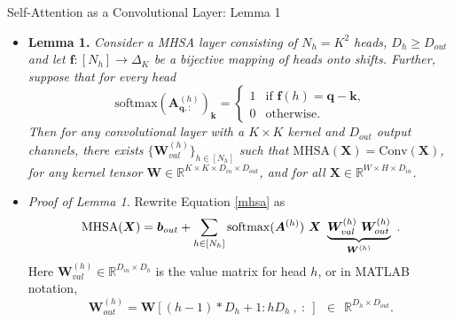 \documentclass[9pt]{beamer}
\newcommand{\bb}{\mathbb}
\newcommand{\mb}{\bm}
\begin{document}
\begin{frame}{Self-Attention as a Convolutional Layer: Lemma 1}
\begin{itemize}
\item \textbf{Lemma 1.} {\em Consider a MHSA layer consisting of $N_h = K^2$ heads, $D_h\geq D_{out}$ and let $\bm f:[N_h]\rightarrow\Delta_K$ be a bijective mapping of heads onto shifts. Further, suppose that for every head
\begin{equation}
\mathrm{softmax}(\mb A^{(h)}_{\mb q,:})_{\mb k} = \begin{cases}
    1 & \text{if } \mb f(h) = \mb q - \mb k,
    \\ 0 & \text{otherwise}.
    \end{cases} \label{lemma1_assumption}
\end{equation}
Then for any convolutional layer with a $K\times K$ kernel and $D_{out}$ output channels, there exists $\{\bm W_{val}^{(h)}\}_{h\in[N_h]}$ such that $\mathrm{MHSA}(\bm X) = \mathrm{Conv}(\bm X)$, for any kernel tensor $\bm W \in \bb R^{K\times K \times D_{in} \times D_{out}}$, and for all $\bm X\in\bb R^{W\times H\times D_{in}}$.}

\vspace{.05in}
\item \textit{Proof of Lemma 1.} Rewrite Equation \eqref{mhsa} as
\begin{equation}
    \mathrm{MHSA}(\mb X) = \mb b_{out} + 
        \sum_{h\in[N_h]} \mathrm{softmax}(\mb A^{(h)})\ \mb X\ 
        \underbrace{\mb W_{val}^{(h)}\ \mb W_{out}^{(h)}}_{\mb W^{(h)}}\ .
    \vspace{-.1in}
\end{equation}
Here $\bm W_{val}^{(h)} \in \bb R^{D_{in}\times D_h}$ is the value matrix for head $h$, or in MATLAB notation,
$$\bm W_{out}^{(h)} = \bm W[(h-1)*D_h+1 : hD_h\ , \ :\ ] \ \ \in\ \ \bb R^{D_h\times D_{out}}.$$
\end{itemize}
\end{frame}
\end{document}

